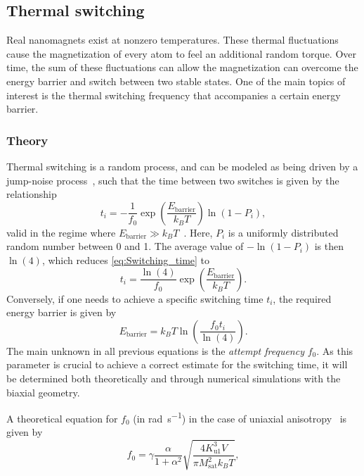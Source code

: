 \documentclass[11pt,a4paper,english]{article}
\begin{document}
\FloatBarrier
\subsection{Thermal switching}
Real nanomagnets exist at nonzero temperatures. These thermal fluctuations cause the magnetization of every atom to feel an additional random torque. Over time, the sum of these fluctuations can allow the magnetization can overcome the energy barrier and switch between two stable states. One of the main topics of interest is the thermal switching frequency that accompanies a certain energy barrier.

\subsubsection{Theory}
Thermal switching is a random process, and can be modeled as being driven by a jump-noise process~\cite{MagDynamics_JumpNoise}, such that the time between two switches is given by the relationship
\begin{equation}
    t_i = -\frac{1}{f_0} \exp(\frac{E_\mathrm{barrier}}{k_B T}) \ln(1-P_i) \mathrm{,}
    \label{eq:Switching_time}
\end{equation}
valid in the regime where $E_\mathrm{barrier} \gg k_B T$~\cite{RandomSwitch_MonteCarlo}. Here, $P_i$ is a uniformly distributed random number between 0 and 1. The average value of $-\ln(1-P_i)$ is then $\ln(4)$, which reduces \cref{eq:Switching_time} to
\begin{equation}
    t_i = \frac{\ln(4)}{f_0} \exp(\frac{E_\mathrm{barrier}}{k_B T})  \mathrm{.}
    \label{eq:Switching_time_average}
\end{equation}
Conversely, if one needs to achieve a specific switching time $t_i$, the required energy barrier is given by
\begin{equation}
    E_\mathrm{barrier} = k_B T \ln(\frac{f_0 t_i}{\ln(4)}) \mathrm{.}
\end{equation}
The main unknown in all previous equations is the \textit{attempt frequency} $f_0$. As this parameter is crucial to achieve a correct estimate for the switching time, it will be determined both theoretically and through numerical simulations with the biaxial geometry. \par
A theoretical equation for $f_0$ (in \si{\radian\per\second}) in the case of uniaxial anisotropy~\cite{MuMax3, LEL-17b, f0_mumax3_reference} is given by
\begin{equation}
    f_0 = \gamma \frac{\alpha}{1+\alpha^2} \sqrt{\frac{4 K_\mathrm{u1}^3 V}{\pi M_\mathrm{sat}^2 k_B T}} \mathrm{,}
    \label{eq:f0_theoretical_uniaxial}
\end{equation}
\end{document}
